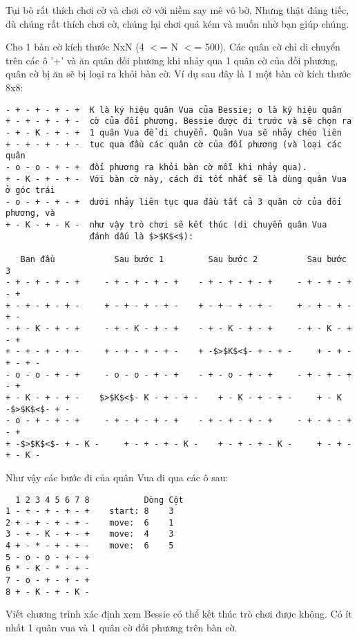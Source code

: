 



   Tụi bò rất thích chơi cờ và chơi cờ với niềm say mê vô bờ. Nhưng thật đáng tiếc, dù chúng rất thích chơi cờ, chúng lại chơi  quá kém và muốn nhờ bạn giúp chúng.  

   Cho 1 bàn cờ kích thước NxN (4 $<$= N $<$= 500).  Các quân cờ chỉ di chuyển trên các ô '+' và ăn quân đối phương khi nhảy qua 1 quân cờ của đối phương, quân cờ bị ăn sẽ bị loại ra khỏi bàn cờ. Ví dụ sau đây là 1 một bàn cờ kích thước 8x8:  
\begin{verbatim}
- + - + - + - +  K là ký hiệu quân Vua của Bessie; o là ký hiệu quân
+ - + - + - + -  cờ của đối phương. Bessie được đi trước và sẽ chọn ra 
- + - K - + - +  1 quân Vua để di chuyển. Quân Vua sẽ nhảy chéo liên 
+ - + - + - + -  tục qua đầu các quân cờ của đối phương (và loại các quân 
- o - o - + - +  đối phương ra khỏi bàn cờ mỗi khi nhảy qua).
+ - K - + - + -  Với bàn cờ này, cách đi tốt nhất sẽ là dùng quân Vua ở góc trái 
- o - + - + - +  dưới nhảy liên tục qua đầu tất cả 3 quân cờ của đối phương, và 
+ - K - + - K -  như vậy trò chơi sẽ kết thúc (di chuyển quân Vua
                 đánh dấu là $>$K$<$):

   Ban đầu            Sau bước 1         Sau bước 2          Sau bước 3
- + - + - + - +     - + - + - + - +    - + - + - + - +     - + - + - + - +
+ - + - + - + -     + - + - + - + -    + - + - + - + -     + - + - + - + -
- + - K - + - +     - + - K - + - +    - + - K - + - +     - + - K - + - +
+ - + - + - + -     + - + - + - + -    + -$>$K$<$- + - + -     + - + - + - + -
- o - o - + - +     - o - o - + - +    - + - o - + - +     - + - + - + - +
+ - K - + - + -    $>$K$<$- K - + - + -    + - K - + - + -     + - K -$>$K$<$- + -
- o - + - + - +     - + - + - + - +    - + - + - + - +     - + - + - + - +
+ -$>$K$<$- + - K -     + - + - + - K -    + - + - + - K -     + - + - + - K -
\end{verbatim}

   Như vậy các bước đi của quân Vua đi qua các ô sau:  
\begin{verbatim}
  1 2 3 4 5 6 7 8           Dòng Cột
1 - + - + - + - +    start: 8    3
2 + - + - + - + -    move:  6    1
3 - + - K - + - +    move:  4    3
4 + - * - + - + -    move:  6    5
5 - o - o - + - +
6 * - K - * - + - 
7 - o - + - + - + 
8 + - K - + - K - 
\end{verbatim}

   Viết chương trình xác định xem Bessie có thể kết thúc trò chơi được không. Có ít nhất 1 quân vua và 1 quân cờ đối phương trên bàn cờ.  

